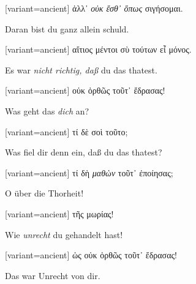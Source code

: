 \begin{greek}[variant=ancient]%
ἀλλ᾽ \emph{οὐκ ἔσθ᾽ ὅπως} σιγήσομαι.

\end{greek}%
\switchcolumn*

Daran bist du ganz allein schuld. 

\switchcolumn

\begin{greek}[variant=ancient]%
αἴτιος μέντοι σὺ τούτων εἶ μόνος.

\end{greek}%
\switchcolumn*

Es war \emph{nicht richtig, daß} du das thatest.

\switchcolumn

\begin{greek}[variant=ancient]%
οὐκ ὀρθῶς τοῦτ᾽ ἔδρασας!

\end{greek}%
\switchcolumn*

Was geht das \emph{dich} an?

\switchcolumn

\begin{greek}[variant=ancient]%
τί δὲ σοὶ τοῦτο;

\end{greek}%
\switchcolumn*

Was fiel dir denn ein, daß du das thatest? 

\switchcolumn

\begin{greek}[variant=ancient]%
τί δὴ \emph{μαθὼν} τοῦτ᾽ ἐποίησας;

\end{greek}%
\switchcolumn*

O über die Thorheit! 

\switchcolumn

\begin{greek}[variant=ancient]%
τῆς μωρίας!

\end{greek}%
\switchcolumn*

Wie \emph{unrecht} du gehandelt hast!

\switchcolumn

\begin{greek}[variant=ancient]%
ὡς οὐκ ὀρθῶς τοῦτ᾽ ἔδρασας!

\end{greek}%
\switchcolumn*

Das war Unrecht von dir. 

